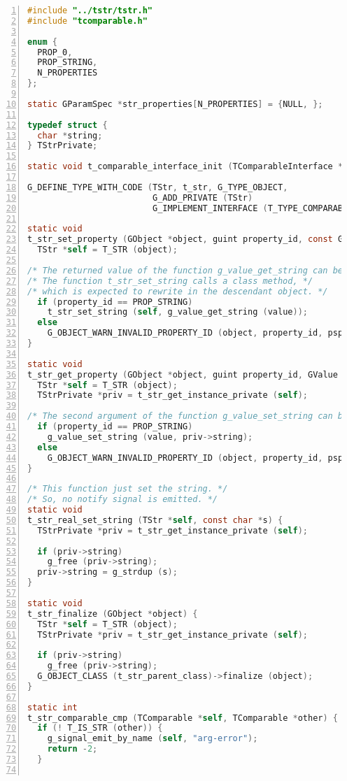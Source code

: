 \begin{lstlisting}[language=C, numbers=left]
#include "../tstr/tstr.h"
#include "tcomparable.h"

enum {
  PROP_0,
  PROP_STRING,
  N_PROPERTIES
};

static GParamSpec *str_properties[N_PROPERTIES] = {NULL, };

typedef struct {
  char *string;
} TStrPrivate;

static void t_comparable_interface_init (TComparableInterface *iface);

G_DEFINE_TYPE_WITH_CODE (TStr, t_str, G_TYPE_OBJECT,
                         G_ADD_PRIVATE (TStr)
                         G_IMPLEMENT_INTERFACE (T_TYPE_COMPARABLE, t_comparable_interface_init))

static void
t_str_set_property (GObject *object, guint property_id, const GValue *value, GParamSpec *pspec) {
  TStr *self = T_STR (object);

/* The returned value of the function g_value_get_string can be NULL. */
/* The function t_str_set_string calls a class method, */
/* which is expected to rewrite in the descendant object. */
  if (property_id == PROP_STRING)
    t_str_set_string (self, g_value_get_string (value));
  else
    G_OBJECT_WARN_INVALID_PROPERTY_ID (object, property_id, pspec);
}

static void
t_str_get_property (GObject *object, guint property_id, GValue *value, GParamSpec *pspec) {
  TStr *self = T_STR (object);
  TStrPrivate *priv = t_str_get_instance_private (self);

/* The second argument of the function g_value_set_string can be NULL. */
  if (property_id == PROP_STRING)
    g_value_set_string (value, priv->string);
  else
    G_OBJECT_WARN_INVALID_PROPERTY_ID (object, property_id, pspec);
}

/* This function just set the string. */
/* So, no notify signal is emitted. */
static void
t_str_real_set_string (TStr *self, const char *s) {
  TStrPrivate *priv = t_str_get_instance_private (self);

  if (priv->string)
    g_free (priv->string);
  priv->string = g_strdup (s);
}

static void
t_str_finalize (GObject *object) {
  TStr *self = T_STR (object);
  TStrPrivate *priv = t_str_get_instance_private (self);

  if (priv->string)
    g_free (priv->string);
  G_OBJECT_CLASS (t_str_parent_class)->finalize (object);
}

static int
t_str_comparable_cmp (TComparable *self, TComparable *other) {
  if (! T_IS_STR (other)) {
    g_signal_emit_by_name (self, "arg-error");
    return -2;
  }


\end{lstlisting}
